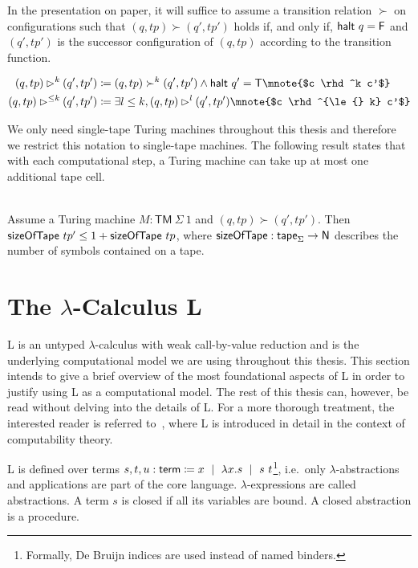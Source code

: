 In the presentation on paper, it will suffice to assume a transition relation $\succ$ on configurations such that 
$(q, tp) \succ (q', tp')$ holds if, and only if, $\textsf{halt}~q = \mathsf{F}$ and $(q', tp')$ is the successor configuration of $(q, tp)$ according to the transition function. 
\begin{definition}
  \begin{align*}
    (q, tp) \rhd^{k} (q', tp') &\defeq (q, tp) \succ^k (q', tp') \land \textsf{halt}~q' = \btrue \mnote{$c \rhd^k c'$}\\
    (q, tp) \rhd^{\le k} (q', tp') &\defeq \exists l \le k, (q, tp) \rhd^l (q', tp')\mnote{$c \rhd^{\le{} k} c'$}
  \end{align*}
\end{definition}

We only need single-tape Turing machines throughout this thesis and therefore we restrict this notation to single-tape machines.
The following result states that with each computational step, a Turing machine can take up at most one additional tape cell. 
\begin{lemma}\label{lem:time_bounds_space}~\\
  Assume a Turing machine $M : \textsf{TM}~\Sigma~1$ and $(q, tp) \succ (q', tp')$. Then $\textsf{sizeOfTape}~tp' \le 1 +{\textsf{sizeOfTape}~tp}$, 
  where $\textsf{sizeOfTape} : \textsf{tape}_\Sigma \rightarrow \mathsf{N}$ describes the number of symbols contained on a tape.
\end{lemma}

\newcommand{\Lterm}{\textsf{term}}
\section{The $\lambda$-Calculus L}
L is an untyped $\lambda$-calculus with weak call-by-value reduction and is the underlying computational model we are using throughout this thesis. 
This section intends to give a brief overview of the most foundational aspects of L in order to justify using L as a computational model. The rest of this thesis can, however, be read without delving into the details of L. 
For a more thorough treatment, the interested reader is referred to~\cite{ForsterSmolka:2017:L-Computability}, where L is introduced in detail in the context of computability theory.

L is defined over terms $s, t, u: \Lterm \defeq x \bnfmid \lambda x. s \bnfmid s~t$\footnote{Formally, De Bruijn indices are used instead of named binders.}, i.e.\ only $\lambda$-abstractions and applications are part of the core language. $\lambda$-expressions are called abstractions. A term $s$ is closed if all its variables are bound. A closed abstraction is a procedure.

